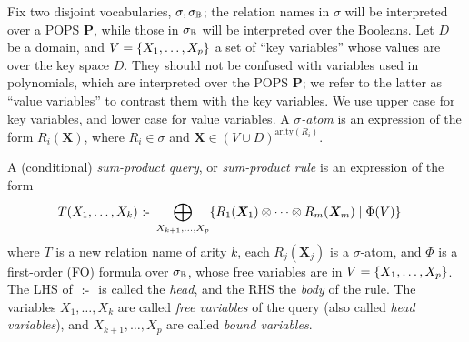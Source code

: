 % 
% 

Fix two disjoint vocabularies, $\sigma, \sigma_\mathbb B$; the relation names
in $\sigma$ will be interpreted over a POPS $\bm P$, while those in
$\sigma_\mathbb B$ will be interpreted over the Booleans.  Let $D$ be a
domain, and $V = \{X_1, \ldots, X_p\}$ a set of ``key variables''
whose values are over the key space $D$. They should not be
confused with variables used in polynomials, which are interpreted
over the POPS $\bm P$; we refer to the latter as ``value variables'' to
contrast them with
the key variables.
We use upper case for key variables, and
lower case for value variables.  A {\em $\sigma$-atom} is an expression
of the form $R_i(\bm X)$, where $R_i \in \sigma$ and $\bm X \in (V \cup D)^{\text{arity}(R_i)}$.

\begin{defn} \label{def:sum:product} A (conditional) {\em sum-product query}, or
{\em sum-product rule} is an expression of the form
%
  \begin{align}
    T(X_1, \ldots, X_k) &\text{ :- } \bigoplus_{X_{k+1}, \ldots,X_p} \{{R_1(\bm X_1) \otimes
    \cdots \otimes R_m(\bm X_m)}\mid{\Phi(V)}\}  \label{eq:t:monomial}
  \end{align}
%
  where $T$ is a new relation name of arity $k$, each $R_j(\bm X_j)$
  is a $\sigma$-atom, and $\Phi$ is a first-order (FO) formula over
  $\sigma_\mathbb B$, whose free variables are in
  $V = \{X_1, \ldots, X_p\}$.  The LHS of $\text{ :- }$ is called the {\em
    head}, and the RHS the {\em body} of the rule.  The variables
  $X_1, \ldots, X_k$ are called {\em free variables} of the query
  (also called {\em head variables}), and $X_{k+1}, \ldots, X_p$ are
  called {\em bound variables}.
\end{defn}

